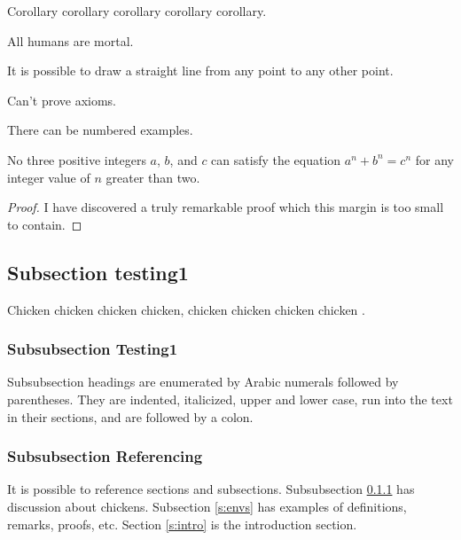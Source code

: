 \documentclass{jcse}
\begin{document}
\begin{corollary}
Corollary corollary corollary corollary corollary.
\end{corollary}

\begin{proposition}
All humans are mortal.
\end{proposition}

\begin{axiom}
It is possible to draw a straight line from any point to any other point.
\end{axiom}

\begin{remark}
Can't prove axioms.
\end{remark}

\begin{example}
There can be numbered examples.
\end{example}

\begin{theorem}
No three positive integers $a$, $b$, and $c$ can satisfy the equation
$a^n + b^n = c^n$ for any integer value of $n$ greater than two.
\end{theorem}
\begin{proof}
I have discovered a truly remarkable proof which this margin
is too small to contain.
\end{proof}



\subsection{Subsection testing1}
Chicken chicken chicken chicken,
chicken chicken chicken chicken \cite{Zongker2006}.

\subsubsection{Subsubsection Testing1} \label{ss:testing1}

Subsubsection headings are enumerated by Arabic numerals followed by
parentheses. They are indented, italicized, upper and lower case,
run into the text in their sections, and are followed by a colon.

\subsubsection{Subsubsection Referencing}
It is possible to reference sections and subsections.
Subsubsection \ref{ss:testing1} has discussion about chickens.
Subsection \ref{s:envs} has examples of definitions, remarks, proofs, etc.
Section \ref{s:intro} is the introduction section.
\end{document}
